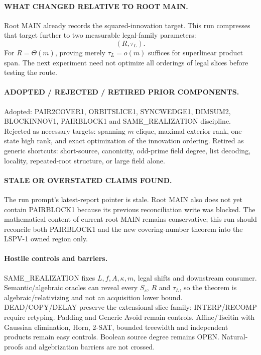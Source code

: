 \documentclass[11pt]{article}
\begin{document}
\paragraph{WHAT CHANGED RELATIVE TO ROOT MAIN.}
Root MAIN already records the squared-innovation target. This run compresses that target further to two measurable legal-family parameters:
\[
(R,\tau_L).
\]
For $R=\Theta(m)$, proving merely $\tau_L=o(m)$ suffices for superlinear product span. The next experiment need not optimize all orderings of legal slices before testing the route.

\paragraph{ADOPTED / REJECTED / RETIRED PRIOR COMPONENTS.}
Adopted: PAIR2COVER1, ORBITSLICE1, SYNCWEDGE1, DIMSUM2, BLOCKINNOV1, PAIRBLOCK1 and SAME\_REALIZATION discipline.
Rejected as necessary targets: spanning $m$-clique, maximal exterior rank, one-state high rank, and exact optimization of the innovation ordering.
Retired as generic shortcuts: short-source, canonicity, odd-prime field degree, list decoding, locality, repeated-root structure, or large field alone.

\paragraph{STALE OR OVERSTATED CLAIMS FOUND.}
The run prompt's latest-report pointer is stale. Root MAIN also does not yet contain PAIRBLOCK1 because its previous reconciliation write was blocked. The mathematical content of current root MAIN remains conservative; this run should reconcile both PAIRBLOCK1 and the new covering-number theorem into the LSPV-1 owned region only.

\paragraph{Hostile controls and barriers.}
SAME\_REALIZATION fixes $L,f,A,\kappa,m$, legal shifts and downstream consumer. Semantic/algebraic oracles can reveal every $S_s$, $R$ and $\tau_L$, so the theorem is algebraic/relativizing and not an acquisition lower bound. DEAD/COPY/DELAY preserve the extensional slice family; INTERP/RECOMP require retyping. Padding and Generic Avoid remain controls. Affine/Tseitin with Gaussian elimination, Horn, 2-SAT, bounded treewidth and independent products remain easy controls. Boolean source degree remains OPEN. Natural-proofs and algebrization barriers are not crossed.
\end{document}
